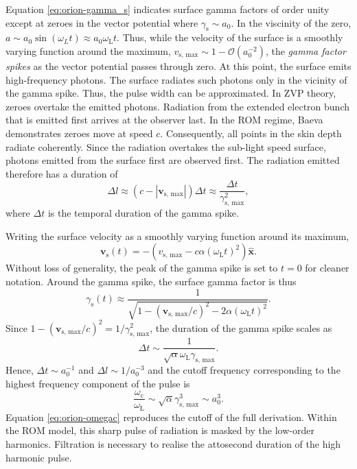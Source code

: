 Equation \ref{eq:orion-gamma_s} indicates surface gamma factors of order unity except at zeroes in the vector potential where $\gamma_\mathrm{s} \sim a_0$. In the viscinity of the zero, $a \sim a_0\sin(\omega_L t) \approx a_0\omega_\mathrm{L}t$. Thus, while the velocity of the surface is a smoothly varying function around the maximum, $v_\mathrm{s,\, max} \sim 1 - \mathcal{O}(a_0^{-2})$, the \textit{gamma factor spikes} as the vector potential passes through zero. At this point, the surface emits high-frequency photons. The surface radiates such photons only in the vicinity of the gamma spike. Thus, the pulse width can be approximated. In ZVP theory, zeroes overtake the emitted photons. Radiation from the extended electron bunch that is emitted first arrives at the observer last. In the ROM regime, Baeva demonstrates zeroes move at speed $c$. Consequently, all points in the skin depth radiate coherently. Since the radiation overtakes the sub-light speed surface, photons emitted from the surface first are observed first. The radiation emitted therefore has a duration of
\begin{equation}
	\Delta l \approx (c-|\mathbf{v}_\mathrm{s,\, max}|)\Delta t \approx \frac{\Delta t}{\gamma_\mathrm{s,\, max}^2},
\end{equation}
where $\Delta t$ is the temporal duration of the gamma spike. 

Writing the surface velocity as a smoothly varying function around its maximum,
\begin{equation}\label{eq:orion-vs}
	\mathbf{v}_\mathrm{s}(t) = -(v_\mathrm{s,\, max} - c\alpha(\omega_\mathrm{L}t)^2) \mathbf{\hat{x}}.
\end{equation}
Without loss of generality, the peak of the gamma spike is set to $t=0$ for cleaner notation. Around the gamma spike, the surface gamma factor is thus
\begin{equation}
	\gamma_\mathrm{s}(t) \approx \frac{1}{\sqrt{1-(\mathbf{v}_\mathrm{s,\, max}/c)^2 - 2\alpha(\omega_\mathrm{L}t)^2}}.
\end{equation}
Since $1-(\mathbf{v}_\mathrm{s,\, max}/c)^2 = 1/\gamma_\mathrm{s,\, max}^2$, the duration of the gamma spike scales as
\begin{equation}
	\Delta t \sim \frac{1}{\sqrt{\alpha }\omega_\mathrm{L} \gamma_\mathrm{s,\, max}}.
\end{equation}
Hence, $\Delta t \sim a_0^{-1}$ and $\Delta l \sim 1/a_0^{-3}$ and the cutoff frequency corresponding to the highest frequency component of the pulse is
\begin{equation}\label{eq:orion-omegac}
	\frac{\omega_\mathrm{c}}{\omega_\mathrm{L}} \sim \sqrt{\alpha}\gamma_\mathrm{s,\, max}^3 \sim a_0^3.
\end{equation}
Equation \ref{eq:orion-omegac} reproduces the cutoff of the full derivation. Within the ROM model, this sharp pulse of radiation is masked by the low-order harmonics. Filtration is necessary to realise the attosecond duration of the high harmonic pulse.

